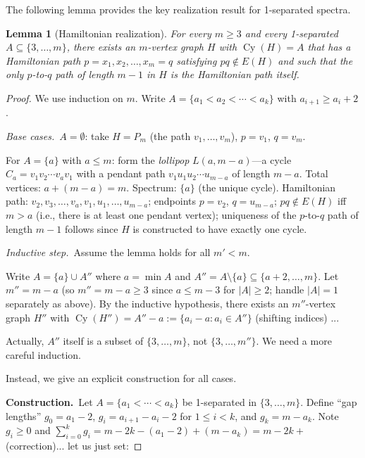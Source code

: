 \documentclass[11pt]{amsart}
\newtheorem{lemma}[theorem]{Lemma}
\DeclareMathOperator{\Cy}{Cy}
\begin{document}
The following lemma provides the key realization result for 1-separated spectra.

\begin{lemma}[Hamiltonian realization]\label{lem:extension}
For every $m\ge 3$ and every 1-separated $A\subseteq\{3,\ldots,m\}$, there exists
an $m$-vertex graph $H$ with $\Cy(H)=A$ that has a Hamiltonian path $p=x_1,x_2,
\ldots,x_m=q$ satisfying $pq\notin E(H)$ and such that the only $p$-to-$q$ path of
length $m-1$ in $H$ is the Hamiltonian path itself.
\end{lemma}

\begin{proof}
We use induction on $m$.  Write $A=\{a_1<a_2<\cdots<a_k\}$ with $a_{i+1}\ge a_i+2$.

\medskip
\noindent\emph{Base cases.}\ $A=\emptyset$: take $H=P_m$ (the path $v_1,\ldots,v_m$),
$p=v_1$, $q=v_m$. \checkmark

For $A=\{a\}$ with $a\le m$: form the \emph{lollipop} $L(a,m-a)$---a cycle
$C_a=v_1v_2\cdots v_av_1$ with a pendant path $v_1u_1u_2\cdots u_{m-a}$ of length
$m-a$.  Total vertices: $a+(m-a)=m$. \checkmark  Spectrum: $\{a\}$ (the unique cycle). \checkmark
Hamiltonian path: $v_2,v_3,\ldots,v_a,v_1,u_1,\ldots,u_{m-a}$; endpoints $p=v_2$,
$q=u_{m-a}$; $pq\notin E(H)$ iff $m>a$ (i.e., there is at least one pendant vertex);
uniqueness of the $p$-to-$q$ path of length $m-1$ follows since $H$ is constructed to
have exactly one cycle. \checkmark

\medskip
\noindent\emph{Inductive step.}\ Assume the lemma holds for all $m'<m$.

Write $A=\{a\}\cup A''$ where $a=\min A$ and $A''=A\setminus\{a\}
\subseteq\{a+2,\ldots,m\}$.  Let $m''=m-a$ (so $m''=m-a\ge 3$ since $a\le m-3$ for
$|A|\ge 2$; handle $|A|=1$ separately as above).  By the inductive hypothesis, there
exists an $m''$-vertex graph $H''$ with $\Cy(H'')=A''-a:=\{a_i-a:a_i\in A''\}$
(shifting indices) ... 

Actually, $A''$ itself is a subset of $\{3,\ldots,m\}$, not $\{3,\ldots,m''\}$. We
need a more careful induction.

\medskip
Instead, we give an explicit construction for all cases.

\noindent\textbf{Construction.}\ Let $A=\{a_1<\cdots<a_k\}$ be 1-separated in
$\{3,\ldots,m\}$.  Define ``gap lengths'' $g_0=a_1-2$, $g_i=a_{i+1}-a_i-2$ for $1\le
i<k$, and $g_k=m-a_k$.  Note $g_i\ge 0$ and $\sum_{i=0}^k g_i = m - 2k - (a_1-2)+
(m-a_k) = m-2k +$ (correction)... let us just set:


\end{proof}
\end{document}
